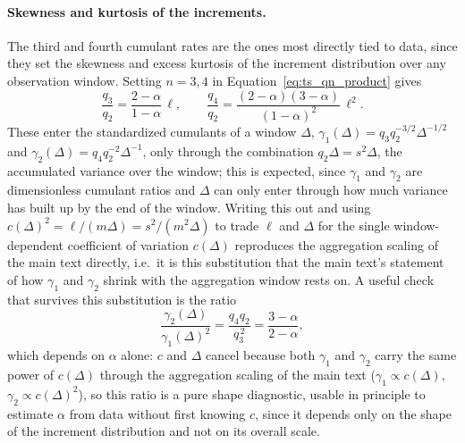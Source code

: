 \documentclass[preprint,12pt]{elsarticle}
\begin{document}
\paragraph*{Skewness and kurtosis of the increments.}
The third and fourth cumulant rates are the ones most directly tied to data, since they set the skewness and excess kurtosis of the increment distribution over any observation window. Setting $n=3,4$ in
Equation~\eqref{eq:ts_qn_product} gives
\begin{equation}
  \frac{q_3}{q_2}=\frac{2-\alpha}{1-\alpha}\,\ell,
  \qquad
  \frac{q_4}{q_2}=\frac{(2-\alpha)(3-\alpha)}{(1-\alpha)^2}\,\ell^2 .
\end{equation}
These enter the standardized cumulants of a window $\Delta$,
$\gamma_1(\Delta)=q_3q_2^{-3/2}\Delta^{-1/2}$ and
$\gamma_2(\Delta)=q_4q_2^{-2}\Delta^{-1}$, only through the combination
$q_2\Delta=s^2\Delta$, the accumulated variance over the window; this is expected, since $\gamma_1$ and $\gamma_2$ are dimensionless cumulant ratios and $\Delta$ can only enter through how much variance has built up by the end of the window. Writing this out and using $c(\Delta)^2=\ell/(m\Delta)=s^2/(m^2\Delta)$
to trade $\ell$ and $\Delta$ for the single window-dependent coefficient of
variation $c(\Delta)$ reproduces the aggregation scaling of the main text
directly, i.e.\ it is this substitution that the main text's statement of how $\gamma_1$ and $\gamma_2$ shrink with the aggregation window rests on. A useful check that survives this substitution is the ratio
\begin{equation}
  \frac{\gamma_2(\Delta)}{\gamma_1(\Delta)^2}=\frac{q_4q_2}{q_3^{\,2}}=\frac{3-\alpha}{2-\alpha},
\end{equation}
which depends on $\alpha$ alone: $c$ and $\Delta$ cancel because both
$\gamma_1$ and $\gamma_2$ carry the same power of $c(\Delta)$ through
the aggregation scaling of the main text ($\gamma_1\propto c(\Delta)$,
$\gamma_2\propto c(\Delta)^2$), so this ratio is a pure shape diagnostic,
usable in principle to estimate $\alpha$ from data without first knowing $c$,
since it depends only on the shape of the increment distribution and not
on its overall scale.
\end{document}
